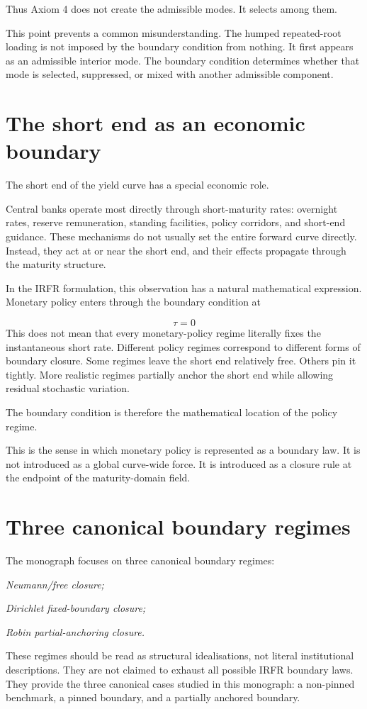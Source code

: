 \documentclass[11pt,oneside]{book}
\begin{document}
Thus Axiom 4 does not create the admissible modes. It selects among
them.

This point prevents a common misunderstanding. The humped repeated-root
loading is not imposed by the boundary condition from nothing. It first
appears as an admissible interior mode. The boundary condition
determines whether that mode is selected, suppressed, or mixed with
another admissible component.

\section{The short end as an economic boundary}\label{the-short-end-as-an-economic-boundary}

The short end of the yield curve has a special economic role.

Central banks operate most directly through short-maturity rates:
overnight rates, reserve remuneration, standing facilities, policy
corridors, and short-end guidance. These mechanisms do not usually set
the entire forward curve directly. Instead, they act at or near the
short end, and their effects propagate through the maturity structure.

In the IRFR formulation, this observation has a natural mathematical
expression. Monetary policy enters through the boundary condition at

\[
\tau = 0
\]
This does not mean that every monetary-policy regime literally fixes the
instantaneous short rate. Different policy regimes correspond to
different forms of boundary closure. Some regimes leave the short end
relatively free. Others pin it tightly. More realistic regimes partially
anchor the short end while allowing residual stochastic variation.

The boundary condition is therefore the mathematical location of the
policy regime.

This is the sense in which monetary policy is represented as a boundary
law. It is not introduced as a global curve-wide force. It is introduced
as a closure rule at the endpoint of the maturity-domain field.

\section{Three canonical boundary regimes}\label{three-canonical-boundary-regimes}

The monograph focuses on three canonical boundary regimes:

\begin{center}\emph{Neumann/free closure;}\end{center}
\begin{center}\emph{Dirichlet fixed-boundary closure;}\end{center}
\begin{center}\emph{Robin partial-anchoring closure.}\end{center}
These regimes should be read as structural idealisations, not literal
institutional descriptions. They are not claimed to exhaust all possible
IRFR boundary laws. They provide the three canonical cases studied in
this monograph: a non-pinned benchmark, a pinned boundary, and a
partially anchored boundary.
\end{document}
